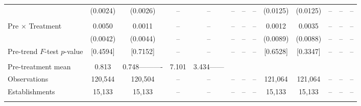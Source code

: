 \documentclass[12pt,letterpaper]{article}
\begin{document}
\begin{table}[]
\begin{threeparttable}
\begin{tabular}{lcccccccccccc}
  & (0.0024) & (0.0026) & -- & -- & -- & -- & -- & (0.0125) & (0.0125) & -- & -- & -- \\
  &  &  &  &  &  &  &  &  &  &  &  & \\
Pre $\times$ Treatment & 0.0050 & 0.0011 & -- & -- & -- & -- & -- & 0.0012 & 0.0035 & -- & -- & -- \\
  & (0.0042) & (0.0044) & -- & -- & -- & -- & -- & (0.0089) & (0.0088) & -- & -- & -- \\
Pre-trend $F$-test $p$-value & [0.4594] & [0.7152] & -- & -- & -- & -- & -- & [0.6528] & [0.3347] & -- & -- & -- \\
  &  &  &  &  &  &  &  &  &  &  &  & \\
Pre-treatment mean & 0.813 & 0.748---------- & 7.101 & 3.434------ \\
Observations & 120{,}544 & 120{,}504 & -- & -- & -- & -- & -- & 121{,}064 & 121{,}064 & -- & -- & -- \\
Establishments & 15{,}133 & 15{,}133 & -- & -- & -- & -- & -- & 15{,}133 & 15{,}133 & -- & -- & -- \\
  &  &  &  &  &  &  &  &  &  &  &  & \\
\midrule

\end{tabular}
\end{threeparttable}
\end{table}
\end{document}
